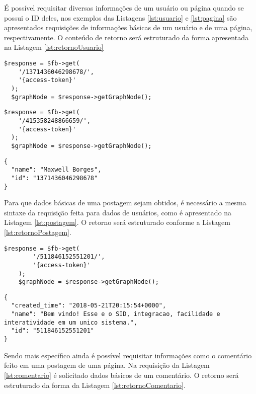 É possível requisitar diversas informações de um usuário ou página quando se possui o ID deles, nos exemplos das Listagens \ref{lst:usuario} e \ref{lst:pagina} são apresentados requisições de informações básicas de um usuário e de uma página, respectivamente. O conteúdo de retorno será estruturado da forma apresentada na Listagem \ref{lst:retornoUsuario}  

\begin{lstlisting}[caption={Requisitar informações de um usuário específico},label={lst:usuario}]
  $response = $fb->get(
    '/1371436046298678/',
    '{access-token}'
  );
  $graphNode = $response->getGraphNode();
\end{lstlisting}

\begin{lstlisting}[caption={Requisitar informações de uma página},label={lst:pagina}]
  $response = $fb->get(
    '/415358248866659/',
    '{access-token}'
  );
  $graphNode = $response->getGraphNode();
\end{lstlisting}

\begin{lstlisting}[caption={Resposta do servidor as requisições \ref{lst:me}, \ref{lst:usuario} e \ref{lst:pagina} (Usuário e Página)},label={lst:retornoUsuario}]
{
  "name": "Maxwell Borges",
  "id": "1371436046298678"
}
\end{lstlisting}

Para que dados básicas de uma postagem sejam obtidos, é necessário a mesma sintaxe da requisição feita para dados de usuários, como é apresentado na Listagem \ref{lst:postagem}. O retorno será estruturado conforme a Listagem \ref{lst:retornoPostagem}.

\begin{lstlisting}[caption={Requisitar informações de uma postagem específica},label={lst:postagem}]
    $response = $fb->get(
        '/511846152551201/',
        '{access-token}'
    );
    $graphNode = $response->getGraphNode();
\end{lstlisting}

\begin{lstlisting}[caption={Resposta do servidor a uma requisição \ref{lst:postagem} (Postagem)},label={lst:retornoPostagem}]
{
  "created_time": "2018-05-21T20:15:54+0000",
  "name": "Bem vindo! Esse e o SID, integracao, facilidade e interatividade em um unico sistema.",
  "id": "511846152551201"
}
\end{lstlisting}

Sendo mais específico ainda é possível requisitar informações como o comentário feito em uma postagem de uma página. Na requisição da Listagem \ref{lst:comentario} é solicitado dados básicos de um comentário. O retorno será estruturado da forma da Listagem \ref{lst:retornoComentario}.


